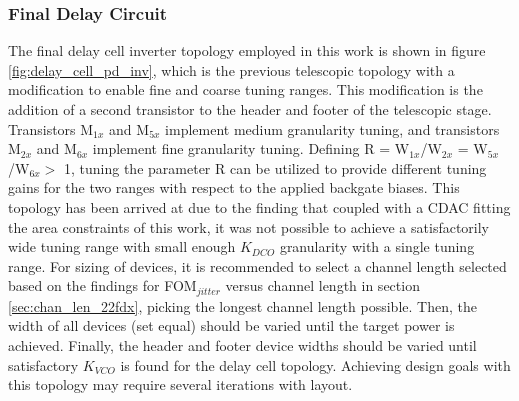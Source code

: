 		\subsubsection{Final Delay Circuit}
	The final delay cell inverter topology employed in this work is shown in figure \ref{fig:delay_cell_pd_inv}, which is the previous telescopic topology with a modification to enable fine and coarse tuning ranges. This modification is the addition of a second transistor to the header and footer of the telescopic stage. Transistors M$_{1x}$ and M$_{5x}$ implement medium granularity tuning, and transistors M$_{2x}$ and M$_{6x}$ implement fine granularity tuning. Defining R = W$_{1x}$/W$_{2x}$ = W$_{5x}$/W$_{6x} >$ 1, tuning the parameter R can be utilized to provide different tuning gains for the two ranges with respect to the applied backgate biases. This topology has been arrived at due to the finding that coupled with a CDAC fitting the area constraints of this work, it was not possible to achieve a satisfactorily wide tuning range with small enough $K_{DCO}$ granularity with a single tuning range. For sizing of devices, it is recommended to select a channel length selected based on the findings for FOM$_{jitter}$ versus channel length in section \ref{sec:chan_len_22fdx}, picking the longest channel length possible. Then, the width of all devices (set equal) should be varied until the target power is achieved. Finally, the header and footer device widths should be varied until satisfactory $K_{VCO}$ is found for the delay cell topology. Achieving design goals with this topology may require several iterations with layout.
